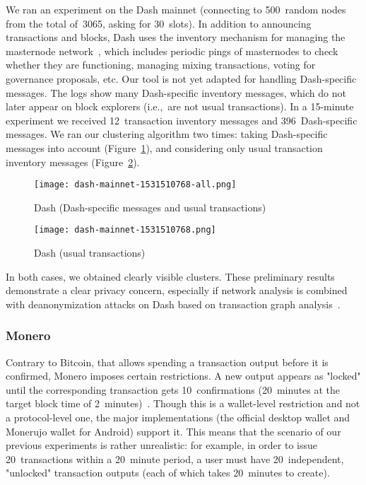 We ran an experiment on the Dash mainnet (connecting to 500~random nodes from the total of~3065, asking for 30~slots).
In addition to announcing transactions and blocks, Dash uses the inventory mechanism for managing the masternode network~\cite{Schinzel2015}, which includes periodic pings of masternodes to check whether they are functioning, managing mixing transactions, voting for governance proposals, etc.
Our tool is not yet adapted for handling Dash-specific messages.
The logs show many Dash-specific inventory messages, which do not later appear on block explorers (i.e.,~are not usual transactions).
In a 15-minute experiment we received  12~transaction inventory messages and 396~Dash-specific messages.
We ran our clustering algorithm two times: taking Dash-specific messages into account (Figure~\ref{fig:dash-all}), and considering only usual transaction inventory messages (Figure~\ref{fig:dash-tx}).

\begin{figure}[!t]
	\texttt{[image: dash-mainnet-1531510768-all.png]}
	\caption{Dash (Dash-specific messages and usual transactions)}
	\label{fig:dash-all}
\end{figure}

\begin{figure}[!t]
	\texttt{[image: dash-mainnet-1531510768.png]}
	\caption{Dash (usual transactions)}
	\label{fig:dash-tx}
\end{figure}

In both cases, we obtained clearly visible clusters.
These preliminary results demonstrate a clear privacy concern, especially if network analysis is combined with deanonymization attacks on Dash based on transaction graph analysis~\cite{Kalodner2017}. 


\subsubsection{Monero}

Contrary to Bitcoin, that allows spending a transaction output before it is confirmed, Monero imposes certain restrictions.
A new output appears as "locked" until the corresponding transaction gets 10~confirmations (20~minutes at the target block time of 2~minutes)~\cite{dpzz2017}.
Though this is a wallet-level restriction and not a protocol-level one, the major implementations (the official desktop wallet and Monerujo wallet for Android) support it.
This means that the scenario of our previous experiments is rather unrealistic: for example, in order to issue 20~transactions within a 20~minute period, a user must have 20~independent, "unlocked" transaction outputs (each of which takes 20~minutes to create).

